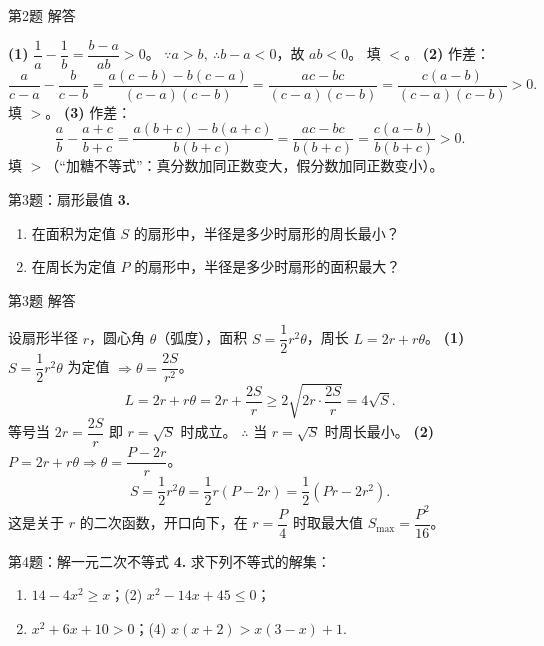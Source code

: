 \documentclass[10pt,aspectratio=169,serif]{beamer}
\begin{document}
\begin{frame}[t]{第2题 解答}
\begin{tcolorbox}[colback=orange!10,colframe=orange,title=\textbf{解}]
\textbf{(1)} $\dfrac{1}{a}-\dfrac{1}{b}=\dfrac{b-a}{ab}>0$。
$\because a>b,\ \therefore b-a<0$，故 $ab<0$。
填 \alert{$<$}。
\vspace{0.5em}
\textbf{(2)} 作差：
\[
\frac{a}{c-a}-\frac{b}{c-b}=\frac{a(c-b)-b(c-a)}{(c-a)(c-b)}
=\frac{ac-bc}{(c-a)(c-b)}=\frac{c(a-b)}{(c-a)(c-b)}>0.
\]
填 \alert{$>$}。
\vspace{0.5em}
\textbf{(3)} 作差：
\[
\frac{a}{b}-\frac{a+c}{b+c}=\frac{a(b+c)-b(a+c)}{b(b+c)}
=\frac{ac-bc}{b(b+c)}=\frac{c(a-b)}{b(b+c)}>0.
\]
填 \alert{$>$}（“加糖不等式”：真分数加同正数变大，假分数加同正数变小）。
\end{tcolorbox}
\end{frame}

\begin{frame}[t]{第3题：扇形最值}
\textbf{3.}
\begin{enumerate}
  \item 在面积为定值 $S$ 的扇形中，半径是多少时扇形的周长最小？
  \item 在周长为定值 $P$ 的扇形中，半径是多少时扇形的面积最大？
\end{enumerate}
\end{frame}

\begin{frame}[t]{第3题 解答}
\begin{tcolorbox}[colback=orange!10,colframe=orange,title=\textbf{解}]
设扇形半径 $r$，圆心角 $\theta$（弧度），面积 $S=\dfrac{1}{2}r^{2}\theta$，周长 $L=2r+r\theta$。
\vspace{0.3em}
\textbf{(1)} $S=\dfrac{1}{2}r^{2}\theta$ 为定值 $\Rightarrow \theta=\dfrac{2S}{r^{2}}$。
\[
L=2r+r\theta=2r+\frac{2S}{r}\ge 2\sqrt{2r\cdot\frac{2S}{r}}=4\sqrt{S}.
\]
等号当 $2r=\dfrac{2S}{r}$ 即 $r=\sqrt{S}$ 时成立。
$\therefore$ 当 $r=\sqrt{S}$ 时周长最小。
\vspace{0.5em}
\textbf{(2)} $P=2r+r\theta\Rightarrow \theta=\dfrac{P-2r}{r}$。
\[
S=\frac{1}{2}r^{2}\theta=\frac{1}{2}r(P-2r)=\frac{1}{2}(Pr-2r^{2}).
\]
这是关于 $r$ 的二次函数，开口向下，在 $r=\dfrac{P}{4}$ 时取最大值 $S_{\max}=\dfrac{P^{2}}{16}$。
\end{tcolorbox}
\end{frame}

\begin{frame}[t]{第4题：解一元二次不等式}
\textbf{4.} 求下列不等式的解集：
\begin{enumerate}
  \item $14-4x^{2}\ge x$；\qquad (2) $x^{2}-14x+45\le 0$；
  \item $x^{2}+6x+10>0$；\qquad (4) $x(x+2)>x(3-x)+1$.
\end{enumerate}
\end{frame}
\end{document}
